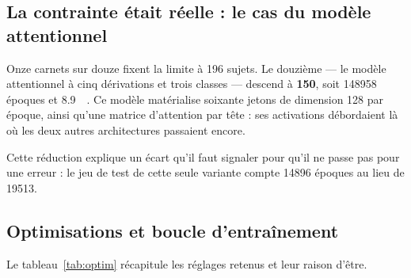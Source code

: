 \subsection{La contrainte était réelle : le cas du modèle attentionnel}

Onze carnets sur douze fixent la limite à 196 sujets. Le douzième — le modèle
attentionnel à cinq dérivations et trois classes — descend à \textbf{150}, soit
\num{148958} époques et \SI{8,9}{\giga\octet}. Ce modèle matérialise soixante jetons de
dimension 128 par époque, ainsi qu'une matrice d'attention par tête : ses activations
débordaient là où les deux autres architectures passaient encore.

Cette réduction explique un écart qu'il faut signaler pour qu'il ne passe pas pour une
erreur : le jeu de test de cette seule variante compte \num{14896} époques au lieu de
\num{19513}.

\subsection{Optimisations et boucle d'entraînement}

Le tableau~\ref{tab:optim} récapitule les réglages retenus et leur raison d'être.

